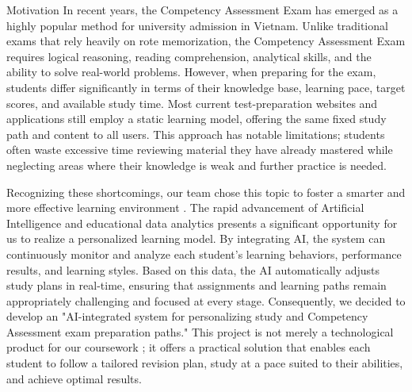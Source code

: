 Motivation
In recent years, the Competency Assessment Exam has emerged as a highly popular method for university admission in Vietnam. Unlike traditional exams that rely heavily on rote memorization, the Competency Assessment Exam requires logical reasoning, reading comprehension, analytical skills, and the ability to solve real-world problems. However, when preparing for the exam, students differ significantly in terms of their knowledge base, learning pace, target scores, and available study time. Most current test-preparation websites and applications still employ a static learning model, offering the same fixed study path and content to all users. This approach has notable limitations; students often waste excessive time reviewing material they have already mastered while neglecting areas where their knowledge is weak and further practice is needed.

Recognizing these shortcomings, our team chose this topic to foster a smarter and more effective learning environment . The rapid advancement of Artificial Intelligence and educational data analytics presents a significant opportunity for us to realize a personalized learning model. By integrating AI, the system can continuously monitor and analyze each student's learning behaviors, performance results, and learning styles. Based on this data, the AI automatically adjusts study plans in real-time, ensuring that assignments and learning paths remain appropriately challenging and focused at every stage. Consequently, we decided to develop an "AI-integrated system for personalizing study and Competency Assessment exam preparation paths." This project is not merely a technological product for our coursework ; it offers a practical solution that enables each student to follow a tailored revision plan, study at a pace suited to their abilities, and achieve optimal results. 
